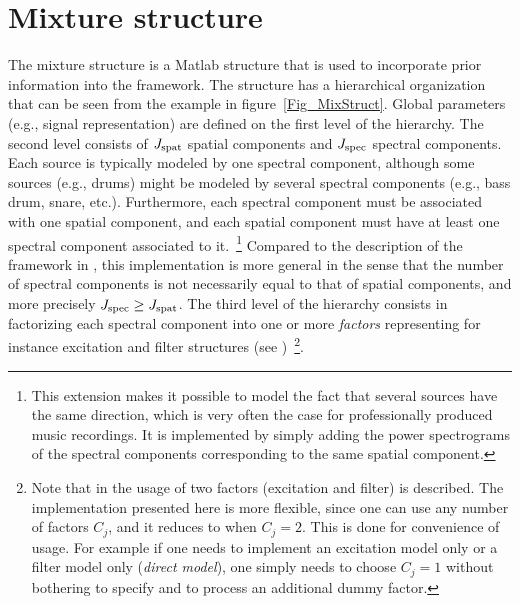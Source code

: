 \documentclass{article}
\begin{document}
\section{Mixture structure}
\label{Sec_MixStruct}

The mixture structure is a Matlab structure that is used to incorporate prior information into the framework.
The structure has a hierarchical organization that can be seen from the example in figure~\ref{Fig_MixStruct}.
Global parameters (e.g., signal representation) are defined on the first level of the hierarchy.
The second level consists of $J_{\rm spat}$ spatial components and $J_{\rm spec}$ spectral components.
Each source is typically modeled by one spectral component, although some sources (e.g., drums) might be modeled by several spectral components (e.g., bass drum, snare, etc.). Furthermore, each spectral component must be associated with one spatial component, and each spatial component
must have at least one spectral component associated to it.~\footnote{This extension makes it possible to model the fact that several sources have the same direction, which is very often the case for professionally produced music recordings. It is implemented by simply adding the power spectrograms of the spectral components corresponding to the same spatial component.}
Compared to the description of the framework in \cite{Ozerov2010a},
this implementation is more general in the sense that the number of spectral components
is not necessarily equal to that of spatial components, and more precisely $J_{\rm spec} \ge J_{\rm spat}$.
The third level of the hierarchy consists in factorizing each spectral component into one or more {\it factors}
representing for instance excitation and filter structures 
(see \cite{Ozerov2010a})~\footnote{Note that in \cite{Ozerov2010a} the usage of two factors (excitation and filter) is described.
The implementation presented here is more flexible, since one can use any number of factors $C_j$, and it reduces to \cite{Ozerov2010a} when $C_j = 2$.
This is done for convenience of usage.
For example if one needs to implement an excitation model only or a filter model only ({\it direct model}), one simply needs to choose $C_j = 1$ without bothering to specify and to process an additional dummy factor.}.
\end{document}
